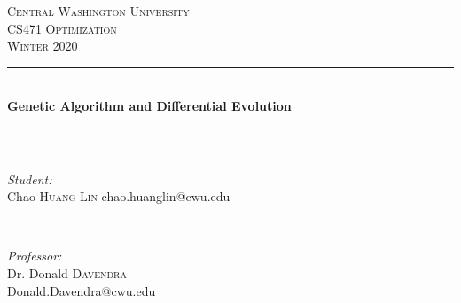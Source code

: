 \documentclass[12pt]{article}
\begin{document}
    
    \begin{titlepage}
        
        \newcommand{\HRule}{\rule{\linewidth}{0.5mm}} %
        
        \center %
        
        
        \textsc{\LARGE Central Washington University}\\[1.5cm] %
        \textsc{\Large CS471 Optimization}\\[0.5cm] %
        \textsc{\large Winter 2020}\\[0.5cm] %
        
        
        \HRule \\[0.4cm]
        { \huge \bfseries Genetic Algorithm and Differential Evolution}\\[0.2cm] %
        \HRule \\[1cm]
        
        
        \begin{minipage}{0.5\textwidth}
            \begin{flushleft} \large
                \emph{Student:}\\
                Chao \textsc{Huang Lin} chao.huanglin@cwu.edu
                
                
            \end{flushleft}
        \end{minipage}
        ~
        \begin{minipage}{0.45\textwidth}
            \begin{flushright} \large
                \emph{Professor:} \\
                Dr. Donald \textsc{Davendra}\\ %
                Donald.Davendra@cwu.edu
            \end{flushright}
        \end{minipage}\\[0.5cm]
        

\end{titlepage}
\end{document}
